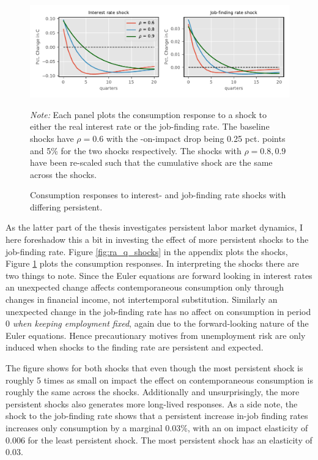 \begin{figure}[H]
\centering
\includegraphics[width=.98\linewidth]{mainmatter/plots/C_analysis/ra_q_shocks_C.pdf} 
\label{fig:C_analysis_q_r}
\caption{Consumption responses to interest- and job-finding rate shocks with differing persistent.}
    \scriptsize
    \centering
    {
    \emph{Note:} Each panel plots the consumption response to a shock to either the real interest rate or the job-finding rate. The baseline shocks have $\rho=0.6$ with the -on-impact drop being 0.25 pct. points and 5\% for the two shocks respectively. The shocks with $\rho=0.8,0.9$ have been re-scaled such that the cumulative shock are the same across the shocks.   }
\end{figure} 

As the latter part of the thesis investigates persistent labor market dynamics, I here foreshadow this a bit in investing the effect of more persistent shocks to the job-finding rate. Figure \ref{fig:ra_q_shocks} in the appendix plots the shocks, Figure \ref{fig:C_analysis_q_r} plots the consumption responses. In interpreting the shocks there are two things to note. Since the Euler equations are forward looking in interest rates an unexpected change affects contemporaneous consumption only through changes in financial income, not intertemporal substitution. Similarly an unexpected change in the job-finding rate has no affect on consumption in period 0 \textit{when keeping employment fixed}, again due to the forward-looking nature of the Euler equations. Hence precautionary motives from unemployment risk are only induced when shocks to the finding rate are persistent and expected. 

The figure shows for both shocks that even though the most persistent shock is roughly 5 times as small on impact the effect on contemporaneous consumption is roughly the same across the shocks. Additionally and unsurprisingly, the more persistent shocks also generates more long-lived responses.  
As a side note, the shock to the job-finding rate shows that a persistent increase in-job finding rates increases only consumption by a marginal 0.03\%, with an on impact elasticity of $0.006$ for the least persistent shock. The most persistent shock has an elasticity of $0.03$.



